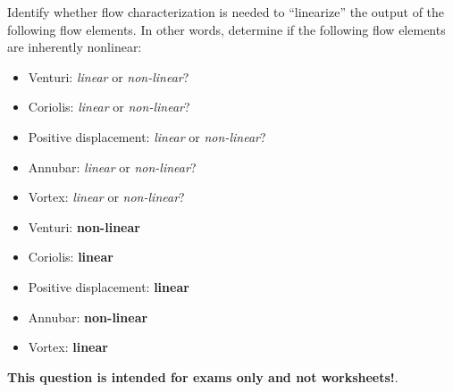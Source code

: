 

Identify whether flow characterization is needed to ``linearize'' the output of the following flow elements.  In other words, determine if the following flow elements are inherently nonlinear:

\begin{itemize}
\item{} Venturi: {\it linear} or {\it non-linear}?
\vskip 5pt
\item{} Coriolis: {\it linear} or {\it non-linear}?
\vskip 5pt
\item{} Positive displacement: {\it linear} or {\it non-linear}?
\vskip 5pt
\item{} Annubar: {\it linear} or {\it non-linear}?
\vskip 5pt
\item{} Vortex: {\it linear} or {\it non-linear}? 
\end{itemize}







\begin{itemize}
\item{} Venturi: {\bf non-linear}
\vskip 5pt
\item{} Coriolis: {\bf linear}
\vskip 5pt
\item{} Positive displacement: {\bf linear}
\vskip 5pt
\item{} Annubar: {\bf non-linear}
\vskip 5pt
\item{} Vortex: {\bf linear}
\end{itemize}







{\bf This question is intended for exams only and not worksheets!}.



